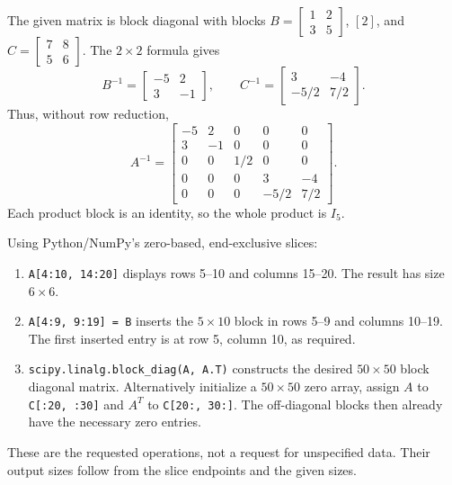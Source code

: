 The given matrix is block diagonal with blocks
$B=\begin{bmatrix}1&2\\3&5\end{bmatrix}$, $[2]$, and
$C=\begin{bmatrix}7&8\\5&6\end{bmatrix}$.
The $2\times2$ formula gives
\[B^{-1}=\begin{bmatrix}-5&2\\3&-1\end{bmatrix},\qquad
C^{-1}=\begin{bmatrix}3&-4\\-5/2&7/2\end{bmatrix}.\]
Thus, without row reduction,
\[A^{-1}=\begin{bmatrix}-5&2&0&0&0\\3&-1&0&0&0\\
0&0&1/2&0&0\\0&0&0&3&-4\\0&0&0&-5/2&7/2\end{bmatrix}.\]
Each product block is an identity, so the whole product is $I_5$.

Using Python/NumPy's zero-based, end-exclusive slices:
\begin{enumerate}[label=(\alph*)]
\item \verb|A[4:10, 14:20]| displays rows 5--10 and columns 15--20.
The result has size $6\times6$.
\item \verb|A[4:9, 9:19] = B| inserts the $5\times10$ block in rows
5--9 and columns 10--19. The first inserted entry is at row 5,
column 10, as required.
\item \verb|scipy.linalg.block_diag(A, A.T)| constructs the desired
$50\times50$ block diagonal matrix. Alternatively initialize a
$50\times50$ zero array, assign $A$ to \verb|C[:20, :30]| and
$A^T$ to \verb|C[20:, 30:]|. The off-diagonal blocks then already
have the necessary zero entries.
\end{enumerate}
These are the requested operations, not a request for unspecified data.
Their output sizes follow from the slice endpoints and the given sizes.

